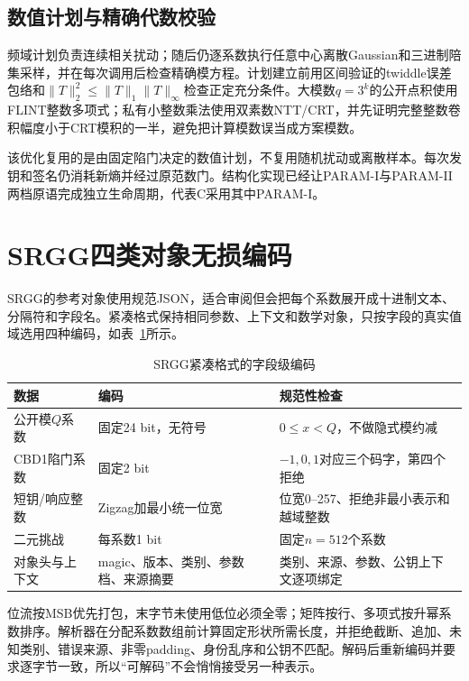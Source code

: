 \documentclass[UTF8,a4paper,12pt,oneside,openany,fontset=fandol]{ctexrep}
\begin{document}
\subsection{数值计划与精确代数校验}
频域计划负责连续相关扰动；随后仍逐系数执行任意中心离散Gaussian和三进制陪集采样，并在每次调用后检查精确模方程。计划建立前用区间验证的twiddle误差包络和$\lVert T\rVert_2^2\leq\lVert T\rVert_1\lVert T\rVert_\infty$检查正定充分条件。大模数$q=3^k$的公开点积使用FLINT整数多项式；私有小整数乘法使用双素数NTT/CRT，并先证明完整整数卷积幅度小于CRT模积的一半，避免把计算模数误当成方案模数。

该优化复用的是由固定陷门决定的数值计划，不复用随机扰动或离散样本。每次发钥和签名仍消耗新熵并经过原范数门。结构化实现已经让PARAM-I与PARAM-II两档原语完成独立生命周期，代表C采用其中PARAM-I。

\section{SRGG四类对象无损编码}
SRGG的参考对象使用规范JSON，适合审阅但会把每个系数展开成十进制文本、分隔符和字段名。紧凑格式保持相同参数、上下文和数学对象，只按字段的真实值域选用四种编码，如表~\ref{tab:srgg-codec-fields}所示。

\begin{table}[htbp]
\centering
\small
\caption{SRGG紧凑格式的字段级编码}
\label{tab:srgg-codec-fields}
\begin{tabularx}{\textwidth}{@{}>{\raggedright\arraybackslash}p{}>{\raggedright\arraybackslash}p{}>{\raggedright\arraybackslash}X@{}}
\toprule
\rowcolor{black!8} 数据 & 编码 & 规范性检查 \\
\midrule
公开模$Q$系数 & 固定24 bit，无符号 & $0\leq x<Q$，不做隐式模约减 \\
CBD1陷门系数 & 固定2 bit & $-1,0,1$对应三个码字，第四个拒绝 \\
短钥/响应整数 & Zigzag加最小统一位宽 & 位宽0--257、拒绝非最小表示和越域整数 \\
二元挑战 & 每系数1 bit & 固定$n=512$个系数 \\
对象头与上下文 & magic、版本、类别、参数档、来源摘要 & 类别、来源、参数、公钥上下文逐项绑定 \\
\bottomrule
\end{tabularx}
\end{table}

位流按MSB优先打包，末字节未使用低位必须全零；矩阵按行、多项式按升幂系数排序。解析器在分配系数数组前计算固定形状所需长度，并拒绝截断、追加、未知类别、错误来源、非零padding、身份乱序和公钥不匹配。解码后重新编码并要求逐字节一致，所以“可解码”不会悄悄接受另一种表示。
\end{document}
